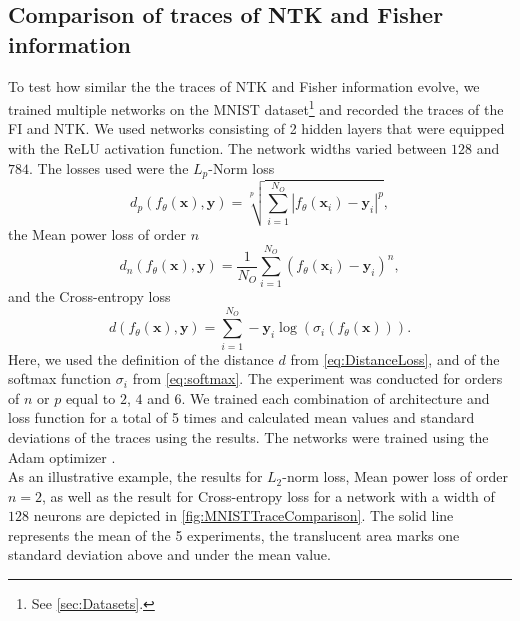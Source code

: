 \subsection{Comparison of traces of NTK and Fisher information}\label{sec:TraceComparisonExperiment}
To test how similar the the traces of NTK and Fisher information evolve, we trained multiple networks on the MNIST dataset\footnote{See \cref{sec:Datasets}.} and recorded the traces of the FI and NTK. We used networks consisting of 2 hidden layers that were equipped with the ReLU activation function. The network widths varied between $128$ and $784$. The losses used were the $L_p$-Norm loss \cite{LpNormSource}
\begin{equation}
	d_p(f_\theta(\mathbf{x}),\mathbf{y}) = \sqrt[p]{\sum_{i=1}^{N_O} |f_\theta(\mathbf{x}_i) - \mathbf{y}_i|^p},
\end{equation}
the Mean power loss of order $n$
\begin{equation}
	d_n(f_\theta(\mathbf{x}),\mathbf{y}) = \frac{1}{N_O} \sum_{i=1}^{N_O} (f_\theta(\mathbf{x}_i)-\mathbf{y}_i)^n,
\end{equation}
and the Cross-entropy loss \cite{LossExamplePaper}
\begin{equation}
	d(f_\theta(\mathbf{x}),\mathbf{y}) = \sum_{i=1}^{N_O} -\mathbf{y}_i \log(\sigma_i(f_\theta(\mathbf{x}))).
\end{equation}
Here, we used the definition of the distance $d$ from \cref{eq:DistanceLoss}, and of the softmax function $\sigma_i$ from \cref{eq:softmax}. The experiment was conducted for orders of $n$ or $p$ equal to $2$, $4$ and $6$. We trained each combination of architecture and loss function for a total of 5 times and calculated mean values and standard deviations of the traces using the results. The networks were trained using the Adam optimizer \cite{adamPaper}.\\
As an illustrative example, the results for $L_2$-norm loss, Mean power loss of order $n=2$, as well as the result for Cross-entropy loss for a network with a width of $128$ neurons are depicted in \cref{fig:MNISTTraceComparison}. The solid line represents the mean of the 5 experiments, the translucent area marks one standard deviation above and under the mean value.\\

